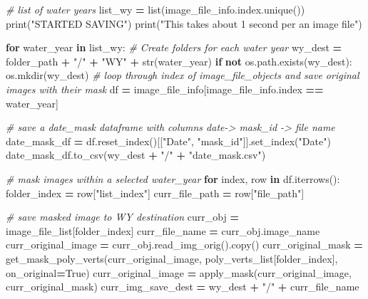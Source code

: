 \documentclass[
]{article}
\newenvironment{Shaded}{\begin{snugshade}}{\end{snugshade}}
\newcommand{\BuiltInTok}[1]{#1}
\newcommand{\CommentTok}[1]{\textcolor[rgb]{0.56,0.35,0.01}{\textit{#1}}}
\newcommand{\ControlFlowTok}[1]{\textcolor[rgb]{0.13,0.29,0.53}{\textbf{#1}}}
\newcommand{\KeywordTok}[1]{\textcolor[rgb]{0.13,0.29,0.53}{\textbf{#1}}}
\newcommand{\NormalTok}[1]{#1}
\newcommand{\OperatorTok}[1]{\textcolor[rgb]{0.81,0.36,0.00}{\textbf{#1}}}
\newcommand{\StringTok}[1]{\textcolor[rgb]{0.31,0.60,0.02}{#1}}
\newcommand{\VariableTok}[1]{\textcolor[rgb]{0.00,0.00,0.00}{#1}}
\begin{document}
\begin{Shaded}
\begin{Highlighting}[]
    \CommentTok{\# list of water years}
\NormalTok{    list\_wy }\OperatorTok{=} \BuiltInTok{list}\NormalTok{(image\_file\_info.index.unique())}
    \BuiltInTok{print}\NormalTok{(}\StringTok{"STARTED SAVING"}\NormalTok{)}
    \BuiltInTok{print}\NormalTok{(}\StringTok{"This takes about 1 second per an image file"}\NormalTok{)}

    \ControlFlowTok{for}\NormalTok{ water\_year }\KeywordTok{in}\NormalTok{ list\_wy:}
        \CommentTok{\# Create folders for each water year}
\NormalTok{        wy\_dest }\OperatorTok{=}\NormalTok{ folder\_path }\OperatorTok{+} \StringTok{"/"} \OperatorTok{+} \StringTok{"WY"} \OperatorTok{+} \BuiltInTok{str}\NormalTok{(water\_year)}
        \ControlFlowTok{if} \KeywordTok{not}\NormalTok{ os.path.exists(wy\_dest):}
\NormalTok{            os.mkdir(wy\_dest)}
        \CommentTok{\# loop through index of image\_file\_objects and save original images with their mask}
\NormalTok{        df }\OperatorTok{=}\NormalTok{ image\_file\_info[image\_file\_info.index }\OperatorTok{==}\NormalTok{ water\_year]}

        \CommentTok{\# save a date\_mask dataframe with columns date{-}\textgreater{} mask\_id {-}\textgreater{} file name}
\NormalTok{        date\_mask\_df }\OperatorTok{=}\NormalTok{ df.reset\_index()[[}\StringTok{"Date"}\NormalTok{, }\StringTok{"mask\_id"}\NormalTok{]].set\_index(}\StringTok{"Date"}\NormalTok{)}
\NormalTok{        date\_mask\_df.to\_csv(wy\_dest }\OperatorTok{+} \StringTok{"/"} \OperatorTok{+} \StringTok{"date\_mask.csv"}\NormalTok{)}

        \CommentTok{\# mask images within a selected water\_year}
        \ControlFlowTok{for}\NormalTok{ index, row }\KeywordTok{in}\NormalTok{ df.iterrows():}
\NormalTok{            folder\_index }\OperatorTok{=}\NormalTok{ row[}\StringTok{"list\_index"}\NormalTok{]}
\NormalTok{            curr\_file\_path }\OperatorTok{=}\NormalTok{ row[}\StringTok{"file\_path"}\NormalTok{]}

            \CommentTok{\# save masked image to WY destination}
\NormalTok{            curr\_obj }\OperatorTok{=}\NormalTok{ image\_file\_list[folder\_index]}
\NormalTok{            curr\_file\_name }\OperatorTok{=}\NormalTok{ curr\_obj.image\_name}
\NormalTok{            curr\_original\_image }\OperatorTok{=}\NormalTok{ curr\_obj.read\_img\_orig().copy()}
\NormalTok{            curr\_original\_mask }\OperatorTok{=}\NormalTok{ get\_mask\_poly\_verts(curr\_original\_image, poly\_verts\_list[folder\_index],}
\NormalTok{                                                     on\_original}\OperatorTok{=}\VariableTok{True}\NormalTok{)}
\NormalTok{            curr\_original\_image }\OperatorTok{=}\NormalTok{ apply\_mask(curr\_original\_image, curr\_original\_mask)}
\NormalTok{            curr\_img\_save\_dest }\OperatorTok{=}\NormalTok{ wy\_dest }\OperatorTok{+} \StringTok{"/"} \OperatorTok{+}\NormalTok{ curr\_file\_name}


\end{Highlighting}
\end{Shaded}
\end{document}

